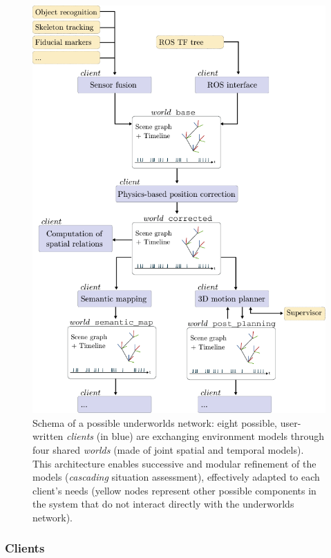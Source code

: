 \documentclass[letterpaper, 10 pt, conference]{ieeeconf}  %
\newcommand{\uwds}{{\sc underworlds}\xspace}
\begin{document}
\begin{figure}
    \centering
    \includegraphics[width=\linewidth]{overview}
    \caption{Schema of a possible \uwds network: eight possible, user-written
    \emph{clients} (in blue) are exchanging environment models through four shared
    \emph{worlds} (made of joint spatial and temporal models). This architecture
    enables successive and modular refinement of the models
    (\emph{cascading} situation assessment), effectively adapted to each
    client's needs (yellow nodes represent other possible components in the system that do not
    interact directly with the \uwds network).}

    \label{fig|scene}

\end{figure}

\subsubsection{Clients}
\end{document}
